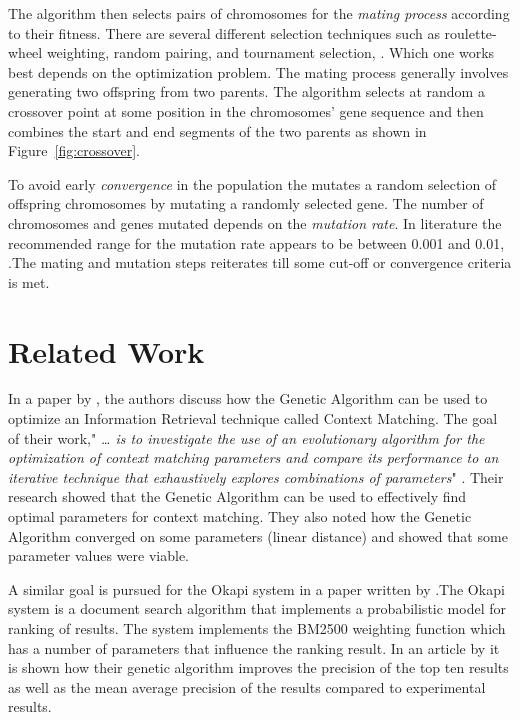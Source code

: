 The algorithm then selects pairs of chromosomes for the \textit{mating process} according to their fitness. There are several different selection techniques such as roulette-wheel weighting, random pairing, and tournament selection, \cite{Haupt2004a}. Which one works best depends on the optimization problem. The mating process generally involves generating two offspring from two parents. The algorithm selects at random a crossover point at some position in the chromosomes' gene sequence and then combines the start and end segments of the two parents as shown in Figure~\ref{fig:crossover}.

To avoid early \textit{convergence} in the population the \GA mutates a random selection of offspring chromosomes by mutating a randomly selected gene. The number of chromosomes and genes mutated depends on the \textit{mutation rate}. In literature the recommended range for the mutation rate appears to be between 0.001 and 0.01, \parencite{Goldberg1989,Negnevitsky2002}.The mating and mutation steps reiterates till some cut-off or convergence criteria is met.

\section{Related Work}
\label{RelatedWork}
In  a paper by \citeauthor{Zakos2005}, the authors discuss how the Genetic Algorithm can be used to optimize an Information Retrieval technique called Context Matching. The goal of their work," \textit{{\dots} is to investigate the use of an evolutionary algorithm for the optimization of context matching parameters and compare its performance to an iterative technique that exhaustively explores combinations of parameters}" \cite[582]{Zakos2005}. Their research showed that the Genetic Algorithm can be used to effectively find optimal parameters for context matching. They also noted how the Genetic Algorithm converged on some parameters (linear distance) and showed that some parameter values were viable.

A similar goal is pursued for the Okapi system in a paper written by \cite{Chuan2003}.The Okapi system is a document search algorithm that implements a probabilistic model for ranking of results. The system implements the BM2500 weighting function which has a number of parameters that influence the ranking result. In an article by \cite{Chuan2003} it is shown how their genetic algorithm improves the precision of the top ten results as well as the mean average precision of the results compared to experimental results.

